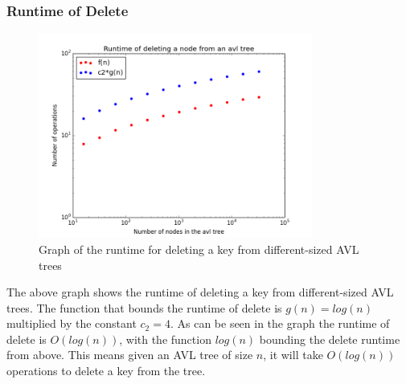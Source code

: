 \documentclass[12pt]{article}
\begin{document}
\subsubsection*{Runtime of Delete}
\begin{figure}[h]
\caption{Graph of the runtime for deleting a key from different-sized AVL
trees}
\includegraphics[width=9cm]{delete_runtime.png}
\centering
\end{figure}
\noindent
The above graph shows the runtime of deleting a key from different-sized AVL
trees.  The function that bounds the runtime of delete is $g(n)=log(n)$
multiplied by the constant $c_2=4$.  As can be seen in the graph the runtime of
delete is $O(log(n))$, with the function $log(n)$ bounding the delete runtime
from above.  This means given an AVL tree of size $n$, it will take $O(log(n))$
operations to delete a key from the tree.

\end{document}
